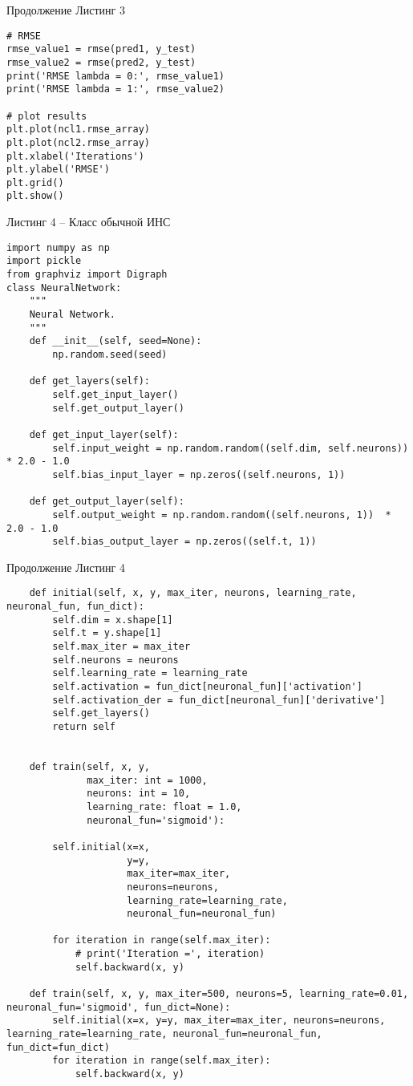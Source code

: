\documentclass[12pt]{extarticle}
\begin{document}
\newpage

Продолжение Листинг 3

\begin{lstlisting}
# RMSE
rmse_value1 = rmse(pred1, y_test)
rmse_value2 = rmse(pred2, y_test)
print('RMSE lambda = 0:', rmse_value1)
print('RMSE lambda = 1:', rmse_value2)

# plot results
plt.plot(ncl1.rmse_array)
plt.plot(ncl2.rmse_array)
plt.xlabel('Iterations')
plt.ylabel('RMSE')
plt.grid()
plt.show()
\end{lstlisting}

Листинг 4 -- Класс обычной ИНС

\begin{lstlisting}
import numpy as np
import pickle
from graphviz import Digraph
class NeuralNetwork:
    """
    Neural Network.
    """
    def __init__(self, seed=None):
        np.random.seed(seed)

    def get_layers(self):
        self.get_input_layer()
        self.get_output_layer()

    def get_input_layer(self):
        self.input_weight = np.random.random((self.dim, self.neurons)) * 2.0 - 1.0
        self.bias_input_layer = np.zeros((self.neurons, 1))

    def get_output_layer(self):
        self.output_weight = np.random.random((self.neurons, 1))  * 2.0 - 1.0
        self.bias_output_layer = np.zeros((self.t, 1))
\end{lstlisting}

\newpage

Продолжение Листинг 4

\begin{lstlisting}
    def initial(self, x, y, max_iter, neurons, learning_rate, neuronal_fun, fun_dict):
        self.dim = x.shape[1]
        self.t = y.shape[1]
        self.max_iter = max_iter
        self.neurons = neurons
        self.learning_rate = learning_rate
        self.activation = fun_dict[neuronal_fun]['activation']
        self.activation_der = fun_dict[neuronal_fun]['derivative']
        self.get_layers()
        return self


    def train(self, x, y,
              max_iter: int = 1000,
              neurons: int = 10,
              learning_rate: float = 1.0,
              neuronal_fun='sigmoid'):

        self.initial(x=x,
                     y=y,
                     max_iter=max_iter,
                     neurons=neurons,
                     learning_rate=learning_rate,
                     neuronal_fun=neuronal_fun)

        for iteration in range(self.max_iter):
            # print('Iteration =', iteration)
            self.backward(x, y)
           
    def train(self, x, y, max_iter=500, neurons=5, learning_rate=0.01, neuronal_fun='sigmoid', fun_dict=None):
        self.initial(x=x, y=y, max_iter=max_iter, neurons=neurons, learning_rate=learning_rate, neuronal_fun=neuronal_fun, fun_dict=fun_dict)
        for iteration in range(self.max_iter):
            self.backward(x, y)
\end{lstlisting}
\end{document}
